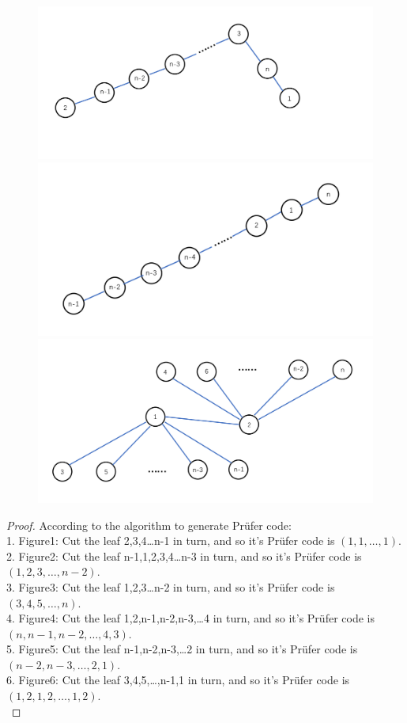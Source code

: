 \begin{figure}
\begin{center}
\caption{ }
\includegraphics[scale=0.4]{figures/15_4.png}
\caption{ }
\includegraphics[scale=0.4]{figures/15_5.png}
\caption{ }
\includegraphics[scale=0.4]{figures/15_6.png}
\end{center}
\end{figure}
\begin{proof}
According to the algorithm to generate Pr\"ufer code:\\
1. Figure1: Cut the leaf 2,3,4\dots n-1 in turn, and so it's Pr\"ufer code is $(1,1,\dots,1)$.\\
2. Figure2: Cut the leaf n-1,1,2,3,4\dots n-3 in turn, and so it's Pr\"ufer code is $(1,2,3,\dots, n-2)$.\\
3. Figure3: Cut the leaf 1,2,3\dots n-2 in turn, and so it's Pr\"ufer code is $(3,4,5,\dots, n)$.\\
4. Figure4: Cut the leaf 1,2,n-1,n-2,n-3,\dots 4 in turn, and so it's Pr\"ufer code is $(n, n-1, n-2,\dots,4,3)$.\\
5. Figure5: Cut the leaf n-1,n-2,n-3,\dots 2 in turn, and so it's Pr\"ufer code is $(n-2,n-3,\dots,2,1)$.\\
6. Figure6: Cut the leaf 3,4,5,\dots ,n-1,1 in turn, and so it's Pr\"ufer code is $(1,2,1,2,\dots,1,2)$.\\
\end{proof}